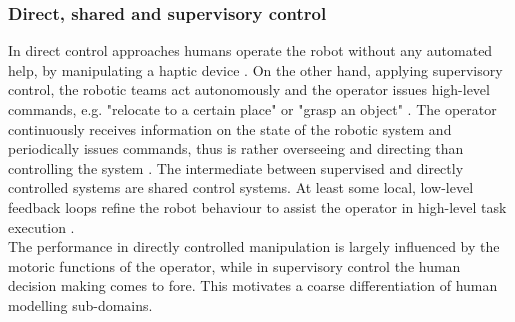 \documentclass[a4paper,twoside, openright,12pt]{report}
\begin{document}
\subsubsection{Direct, shared and supervisory control} 
In direct control approaches humans operate the robot without any automated help, by manipulating a haptic device \cite{Hirche2012}. On the other hand, applying supervisory control, the robotic teams act autonomously and the operator issues high-level commands, e.g. "relocate to a certain place" or "grasp an object" \cite{Peters2015}. The operator continuously receives information on the state of the robotic system and periodically issues commands, thus is rather overseeing and directing than controlling the system \cite{Sheridian1992}.
The intermediate between supervised and directly controlled systems are shared control systems. At least some local, low-level feedback loops refine the robot behaviour to assist the operator in high-level task execution \cite{TeleoperationHandbook}.\\
The performance in directly controlled manipulation is largely influenced by the motoric functions of the operator, while in supervisory control the human decision making comes to fore. This motivates a coarse differentiation of human modelling sub-domains. 
\end{document}
